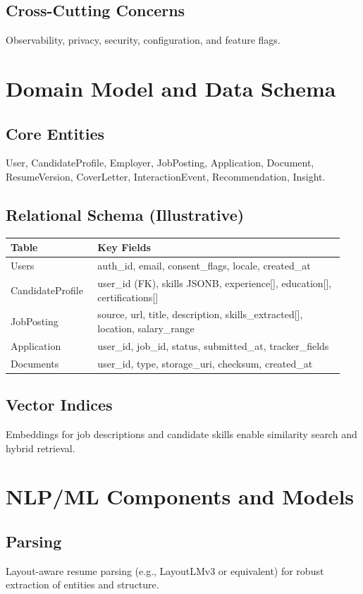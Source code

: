 \documentclass[12pt,a4paper]{article}
\begin{document}
\subsection{Cross-Cutting Concerns}
Observability, privacy, security, configuration, and feature flags.

\section{Domain Model and Data Schema}
\subsection{Core Entities}
User, CandidateProfile, Employer, JobPosting, Application, Document, ResumeVersion, CoverLetter, InteractionEvent, Recommendation, Insight.
\subsection{Relational Schema (Illustrative)}
\begin{longtable}{p{0.24\linewidth} p{0.7\linewidth}}
\toprule
\textbf{Table} & \textbf{Key Fields}\\
\midrule
Users & auth\_id, email, consent\_flags, locale, created\_at\\
CandidateProfile & user\_id (FK), skills JSONB, experience[], education[], certifications[]\\
JobPosting & source, url, title, description, skills\_extracted[], location, salary\_range\\
Application & user\_id, job\_id, status, submitted\_at, tracker\_fields\\
Documents & user\_id, type, storage\_uri, checksum, created\_at\\
\bottomrule
\end{longtable}
\subsection{Vector Indices}
Embeddings for job descriptions and candidate skills enable similarity search and hybrid retrieval.

\section{NLP/ML Components and Models}
\subsection{Parsing}
Layout-aware resume parsing (e.g., LayoutLMv3 or equivalent) for robust extraction of entities and structure.
\end{document}
